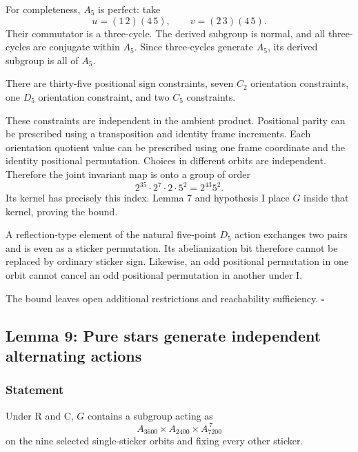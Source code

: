 \documentclass[
  10pt,
  a4paper,
]{article}
\begin{document}
For completeness, \(A_5\) is perfect: take \begin{equation}
u=(1\,2)(4\,5),\qquad v=(2\,3)(4\,5).
\end{equation} Their commutator is a three-cycle. The derived subgroup
is normal, and all three-cycles are conjugate within \(A_5\). Since
three-cycles generate \(A_5\), its derived subgroup is all of \(A_5\).

There are thirty-five positional sign constraints, seven \(C_2\)
orientation constraints, one \(D_5\) orientation constraint, and two
\(C_5\) constraints.

These constraints are independent in the ambient product. Positional
parity can be prescribed using a transposition and identity frame
increments. Each orientation quotient value can be prescribed using one
frame coordinate and the identity positional permutation. Choices in
different orbits are independent. Therefore the joint invariant map is
onto a group of order \begin{equation}
2^{35}\cdot2^7\cdot2\cdot5^2=2^{43}5^2.
\end{equation} Its kernel has precisely this index. Lemma 7 and
hypothesis I place \(G\) inside that kernel, proving the bound.

A reflection-type element of the natural five-point \(D_5\) action
exchanges two pairs and is even as a sticker permutation. Its
abelianization bit therefore cannot be replaced by ordinary sticker
sign. Likewise, an odd positional permutation in one orbit cannot cancel
an odd positional permutation in another under I.

The bound leaves open additional restrictions and reachability
sufficiency. \(\square\)

\subsection{Lemma 9: Pure stars generate independent alternating
actions}\label{lemma-9-pure-stars-generate-independent-alternating-actions}

\subsubsection{Statement}\label{statement-8}

Under R and C, \(G\) contains a subgroup acting as \begin{equation}
A_{3600}\times A_{2400}\times A_{7200}^{\,7}
\end{equation} on the nine selected single-sticker orbits and fixing
every other sticker.
\end{document}
